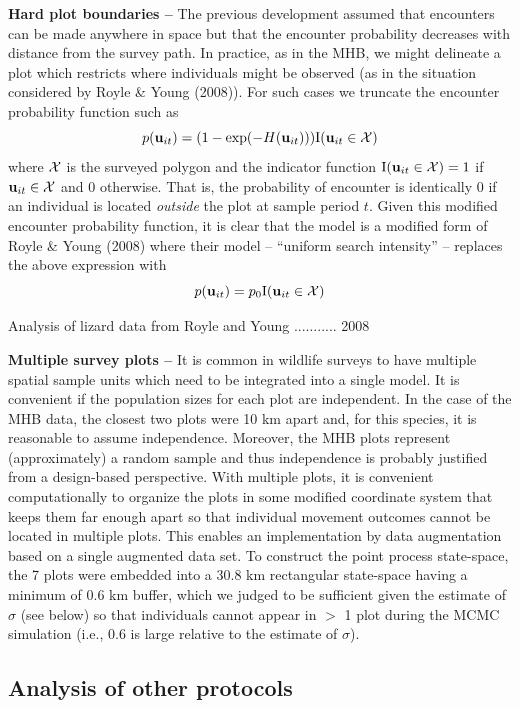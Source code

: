 {\bf Hard plot boundaries -- } The previous development assumed that
encounters can be made anywhere in space but that the encounter
probability decreases with distance from the survey path. In practice,
as in the MHB, we might delineate a plot which restricts where
individuals might be observed (as in the situation considered by Royle
\& Young (2008)). For such cases we truncate the encounter
probability function such as
\[
p({\bf u}_{it}) = (1- \exp(-H({\bf u}_{it}))) \mbox{I}({\bf u}_{it} \in {\cal X})
\]
where ${\cal X}$ is the surveyed polygon
and the indicator function
$\mbox{I}({\bf u}_{it} \in {\cal X}) = 1$ if
${\bf u}_{it} \in {\cal X}$ and 0 otherwise.
That is, the probability of
encounter is identically 0 if an individual is located {\it outside}
the plot at sample period $t$. Given this modified encounter
probability function, it is clear that the model is a modified form of
Royle \& Young (2008) where their model -- ``uniform search
intensity'' -- replaces the above expression with
\[
p({\bf u}_{it}) = p_{0} \mbox{I}({\bf u}_{it} \in {\cal X})
\]

Analysis of lizard data from Royle and Young ........... 2008

{\bf Multiple survey plots -- } It is common in wildlife surveys to
have multiple spatial sample units which need to be integrated into a
single model. It is convenient if the population sizes for each plot
are independent.
In the case of the MHB data, the closest two plots were 10
km apart and, for this species, it is reasonable to assume
independence. Moreover, the MHB plots represent (approximately) a
random sample and thus independence is probably justified from a
design-based perspective.  
With multiple plots, it is
convenient computationally to organize the plots in some modified
coordinate system that keeps them far enough apart so that individual
movement outcomes
cannot be located in multiple plots. This enables an
implementation by data augmentation based on a single augmented data
set.  
To construct the
point process state-space, the 7 plots were embedded into a 30.8 km
rectangular state-space having a minimum of 0.6 km buffer, which we
judged to be sufficient given the estimate of $\sigma$ (see below)
so that individuals cannot appear in $>$ 1 plot during the MCMC
simulation (i.e., $0.6$ is large
relative to the estimate of $\sigma$).





\subsection{Analysis of other protocols}

